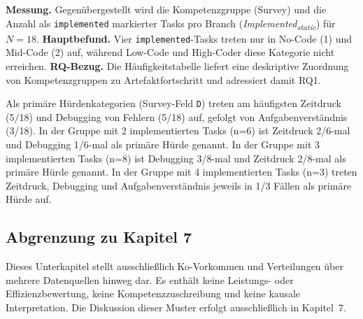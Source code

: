 \noindent \textbf{Messung.} Gegenübergestellt wird die Kompetenzgruppe (Survey) und die Anzahl als \texttt{implemented} markierter Tasks pro Branch (\textit{Implemented\textsubscript{static}}) für $N=18$.
\noindent \textbf{Hauptbefund.} Vier \texttt{implemented}-Tasks treten nur in No-Code (1) und Mid-Code (2) auf, während Low-Code und High-Coder diese Kategorie nicht erreichen.
\noindent \textbf{RQ-Bezug.} Die Häufigkeitstabelle liefert eine deskriptive Zuordnung von Kompetenzgruppen zu Artefaktfortschritt und adressiert damit RQ1.

Als primäre Hürdenkategorien (Survey-Feld \texttt{D}) treten am häufigsten Zeitdruck (5/18) und Debugging von Fehlern (5/18) auf, gefolgt von Aufgabenverständnis (3/18).
In der Gruppe mit 2 implementierten Tasks (n=6) ist Zeitdruck 2/6-mal und Debugging 1/6-mal als primäre Hürde genannt. In der Gruppe mit 3 implementierten Tasks (n=8) ist Debugging 3/8-mal und Zeitdruck 2/8-mal als primäre Hürde genannt.
In der Gruppe mit 4 implementierten Tasks (n=3) treten Zeitdruck, Debugging und Aufgabenverständnis jeweils in 1/3 Fällen als primäre Hürde auf.

\subsection{Abgrenzung zu Kapitel 7}
\label{sec:results_triangulation_boundary}

Dieses Unterkapitel stellt ausschließlich Ko-Vorkommen und Verteilungen über mehrere Datenquellen hinweg dar.
Es enthält keine Leistungs- oder Effizienzbewertung, keine Kompetenzzuschreibung und keine kausale Interpretation.
Die Diskussion dieser Muster erfolgt ausschließlich in Kapitel~7.
